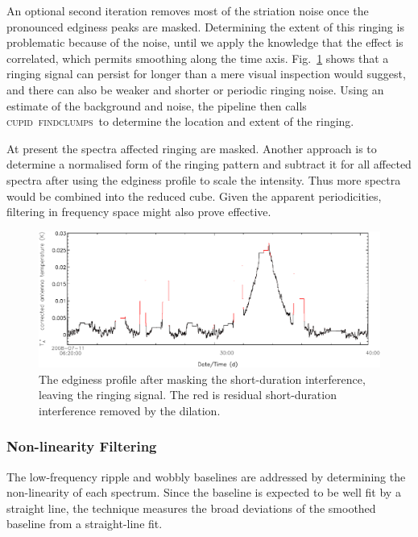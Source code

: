 \documentclass[a4paper,fleqn,usenatbib]{mnras}
\newcommand{\cupid}{\textsc{cupid}}
\newcommand{\findclumps}{\textsc{findclumps}}
\begin{document}
An optional second iteration removes most of the striation noise once
the pronounced edginess peaks are masked.  Determining the extent of
this ringing is problematic because of the noise, until we apply the
knowledge that the effect is correlated, which permits smoothing
along the time axis.
Fig.~\ref{fig:badbase:ringing_edginess_profile} shows that a ringing
signal can persist for longer than a mere visual inspection would
suggest, and there can also be weaker and shorter or periodic ringing
noise.  Using an estimate of the background and noise, the pipeline
then calls \cupid\ \findclumps\ to determine the location and extent
of the ringing.

At present the spectra affected ringing are masked.  Another approach
is to determine a normalised form of the ringing pattern and subtract
it for all affected spectra after using the edginess profile to scale
the intensity.  Thus more spectra would be combined into the reduced
cube.  Given the apparent periodicities, filtering in frequency
space might also prove effective.

\begin{figure}
\includegraphics[width=\textwidth]{ringing_edginess_profile}
\caption{The edginess profile after masking the short-duration
  interference, leaving the ringing signal.  The red is residual
  short-duration interference removed by the dilation.}
\label{fig:badbase:ringing_edginess_profile}
\end{figure}


\subsubsection{Non-linearity Filtering}
\label{sec:non-linearity}

The low-frequency ripple and wobbly baselines are addressed by
determining the non-linearity of each spectrum.  Since the baseline
is expected to be well fit by a straight line, the technique
measures the broad deviations of the smoothed baseline from a
straight-line fit.
\end{document}

